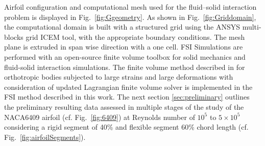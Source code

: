 \documentclass[conf]{new-aiaa}
\begin{document}
Airfoil configuration and computational mesh used for the fluid–solid interaction problem is displayed in Fig.~\ref{fig:Ggeometry}.
%
As shown in Fig.~\ref{fig:Griddomain}, the computational domain is built with a structured grid using the ANSYS multi-blocks grid ICEM tool, with the appropriate boundary conditions.
%
The mesh plane is extruded in span wise direction with a one cell.
%
FSI Simulations are performed with an open-source finite volume toolbox for solid mechanics and fluid-solid interaction simulations.
%
The finite volume method described in \citet{cardiff2018open} for orthotropic bodies subjected to large strains and large deformations with consideration of updated Lagrangian finite volume solver \cite{tukovic2014openfoam} is implemented in the FSI method described in this work.
%
The next section \ref{sec:preliminary} outlines the preliminary resulting data assessed in multiple stages of the study of the NACA6409 airfoil (cf. Fig.~\ref{fig:6409}) at Reynolds number of $10^5$ to $5\times 10^5$ considering a rigid segment of 40\% and flexible segment 60\% chord length (cf. Fig.~\ref{fig:airfoilSegments}).
%
\end{document}
